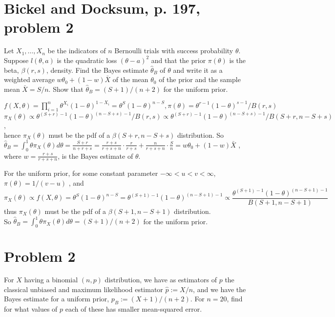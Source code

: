 \documentclass[11pt]{article}
\newcommand{\ProbS}{\iftrue}
\newcommand{\ProbE}{\fi}
\begin{document}
\section{Bickel and Docksum, p. 197, problem 2}
\ProbS
Let $X_1, \dots, X_n$ be the indicators of $n$ Bernoulli trials with success probability $\theta$. Suppose $l(\theta, a)$ is the quadratic loss $(\theta-a)^2$ and that the prior $\pi(\theta)$ is the beta,
$\beta(r, s)$, density. Find the Bayes estimate $\hat{\theta}_B$ of
$\theta$ and write it as a weighted average $w\theta_0 + (1-w)\bar{X}$ of the mean $\theta_0$ of the prior and the sample mean $\bar{X} = S/n$. Show that $\hat{\theta}_B = (S+1)/(n+2)$ for the uniform prior.
\ProbE

$
f(X, \theta) = \prod_{i=1}^{n} \theta^{X_i} (1-\theta)^{1-X_i}
= \theta^{S} (1-\theta)^{n-S},
\pi(\theta) = \theta^{r-1} (1-\theta)^{s-1} / B(r,s)
$
\\
$
\pi_X(\theta) \propto
{\theta^{(S+r)-1}(1-\theta)^{(n-S+s)-1}} / {B(r, s)} \propto
{\theta^{(S+r)-1}(1-\theta)^{(n-S+s)-1}} / {B(S+r, n-S+s)}
$
,\\
hence $\pi_X(\theta)$ must be the pdf of a
$\beta(S+r, n-S+s)$ distribution. So
$
\hat{\theta}_B =
\int_{0}^{1} \theta \pi_X(\theta) d\theta
= \frac{S+r}{n+r+s}
= \frac{r+s}{r+s+n} \cdot \frac{r}{r+s} +
  \frac{n}{r+s+n} \cdot \frac{S}{n}
= w \theta_0 + (1-w) \bar{X}
$
,\\
where $w = \frac{r+s}{r+s+n}$,
is the Bayes estimate of $\theta$.

For the uniform prior, for some constant parameter
$-\infty < u<v < \infty$,
$
\pi(\theta) = 1/(v-u)
$
, and
$$
\pi_X(\theta) \propto
f(X, \theta) =
\theta^{S} (1-\theta)^{n-S}
=
\theta^{(S+1)-1} (1-\theta)^{(n-S+1)-1} \propto
\frac{\theta^{(S+1)-1} (1-\theta)^{(n-S+1)-1}}{B(S+1, n-S+1)}
$$
thus $\pi_X(\theta)$ must be the pdf of a
$\beta(S+1, n-S+1)$ distribution.\\
So
$
\hat{\theta}_B =
\int_{0}^{1} \theta \pi_X(\theta) d\theta
= (S+1)/(n+2)
$
for the uniform prior.

\section{Problem 2}
\ProbS
For $X$ having a binomial $(n,p)$ distribution, we have as estimators of $p$ the classical unbiased and maximum likelihood estimator
$
\hat{p} := X/n
$, and we have the Bayes estimate for a uniform prior,
$
p_B := (X+1)/(n+2)
$. For $n=20$, find for what values of $p$ each of these has smaller mean-squared error.
\ProbE
\end{document}
